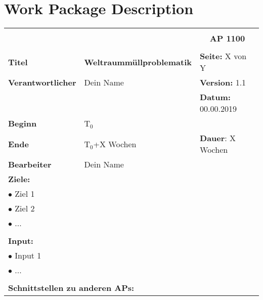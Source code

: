 \section{Work Package Description}
\label{sec:wpd}


\begin{table}[!h]
 \begin{center}
  \begin{tabular}{|p{35mm}||p{55mm}|p{50mm}||p{40mm}|}
   \hline
   \multicolumn{3}{|l||}{\textbf{}} & \multicolumn{1}{c|}{}\\
   \multicolumn{3}{|l||}{\textbf{}} & \multicolumn{1}{c|}{\textbf{AP 1100}}\\
   \multicolumn{3}{|l||}{\textbf{}} & \multicolumn{1}{c|}{}\\
   \hline\hline
   \textbf{Titel} & \multicolumn{2}{p{7cm}||}{\textbf{Weltraummüllproblematik}} & \textbf{Seite:} X von Y\\
   \hline
   \textbf{Verantwortlicher} & \multicolumn{2}{l||}{Dein Name} & \textbf{Version:} 1.1\\
   \hline
   \multicolumn{3}{|l||}{} & \textbf{Datum:} 00.00.2019\\
   \hline\hline
   \textbf{Beginn} & \multicolumn{2}{l||}{T$_0$} & \\
   \hline
   \textbf{Ende} & \multicolumn{2}{l||}{T$_0$+X Wochen} & \textbf{Dauer}: X Wochen\\
   \hline\hline
   \textbf{Bearbeiter} & \multicolumn{3}{l|}{Dein Name}\\
   \hline\hline
   \multicolumn{4}{|p{150mm}|}{\textbf{Ziele:}}\\
   \multicolumn{4}{|p{150mm}|}{$\bullet$ Ziel 1}\\
   \multicolumn{4}{|p{150mm}|}{$\bullet$ Ziel 2}\\
   \multicolumn{4}{|p{150mm}|}{$\bullet$ ...}\\
   \multicolumn{4}{|p{150mm}|}{}\\
   \multicolumn{4}{|p{150mm}|}{\textbf{Input:}}\\
   \multicolumn{4}{|p{150mm}|}{$\bullet$ Input 1}\\
   \multicolumn{4}{|p{150mm}|}{$\bullet$ ...}\\
   \multicolumn{4}{|p{150mm}|}{}\\
   \multicolumn{4}{|p{150mm}|}{\textbf{Schnittstellen zu anderen APs:}}\\

\end{tabular}
\end{center}
\end{table}
